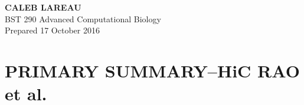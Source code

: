 \documentclass[12pt]{article}
\begin{document}
\begin{minipage}[t]{0.5\linewidth}
    \begin{flushleft}
    \textbf{
    {\huge C}{\Large ALEB} \hspace{-0.1em} 
    {\huge L}{\Large AREAU}}\\
     \hspace*{4mm} BST 290 Advanced Computational Biology \\
     \hspace*{4mm} Prepared 17 October 2016
         \end{flushleft}
\end{minipage}

 
 
\section*{\textbf{{\Large P}{\small RIMARY} {\Large S}{\small UMMARY}{\Large --HiC  }{\small RAO et al.}}}
\end{document}
